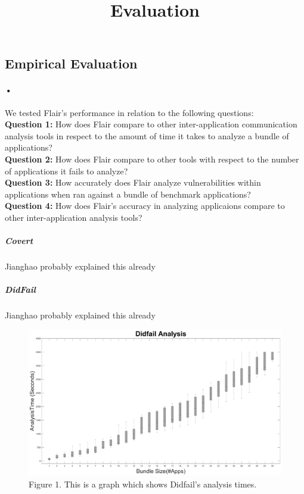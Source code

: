 \documentclass[twocolumn]{article}
\title{Evaluation}
\begin{document}
\begin{center}
\section*{Empirical Evaluation}
\end{center}


\paragraph{•}
	We tested Flair's performance in relation to the following questions:\\
	\textbf{Question 1:} How does Flair compare to other inter-application communication analysis tools in respect to the amount of time it takes to analyze a bundle of applications?\\
	\textbf{Question 2:} How does Flair compare to other tools with respect to the number of applications it fails to analyze?\\
	\textbf{Question 3:} How accurately does Flair analyze vulnerabilities within applications when ran against a bundle of benchmark applications?\\
	\textbf{Question 4:} How does Flair's accuracy in analyzing applicaions compare to other inter-application analysis tools?\\
	
	
	\subparagraph{Covert}
		Jianghao probably explained this already
	\subparagraph{DidFail}
		Jianghao probably explained this already


		\begin{figure}[h]
			\includegraphics[width=\linewidth]{DidfailBoxPlot}
			\caption{Figure 1. This is a graph which shows Didfail's analysis times.}
		\end{figure}
	
\end{document}
